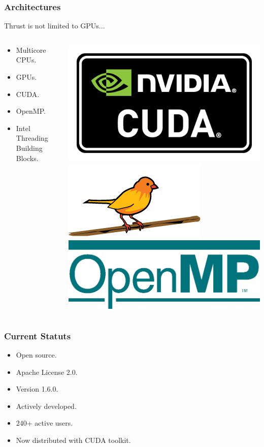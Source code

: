 \documentclass{beamer}
\begin{document}
\begin{frame}
  \frametitle{Architectures}
  Thrust is not limited to GPUs...
  \begin{columns}
    \begin{column}{.6\textwidth}
      \begin{itemize}
      \item Multicore CPUs.
      \item GPUs.
      \item CUDA.
      \item OpenMP.
      \item Intel Threading Building Blocks.
      \end{itemize}
    \end{column}
    \begin{column}{.4\textwidth}
      \includegraphics[width=.38\textwidth]{cuda_logo.jpg} \\
      \vspace{.2cm}
      \includegraphics[width=.38\textwidth]{tbb_logo.png} \\
      \vspace{.5cm}
      \includegraphics[width=.38\textwidth]{openmp_logo.jpg}
    \end{column}
  \end{columns}
\end{frame}

\begin{frame}
  \frametitle{Current Statuts}
  \begin{itemize}
    \item Open source.
    \item Apache License 2.0.
    \item Version 1.6.0.
    \item Actively developed.
    \item 240+ active users.
    \item Now distributed with CUDA toolkit.
  \end{itemize}
\end{frame}
\end{document}
